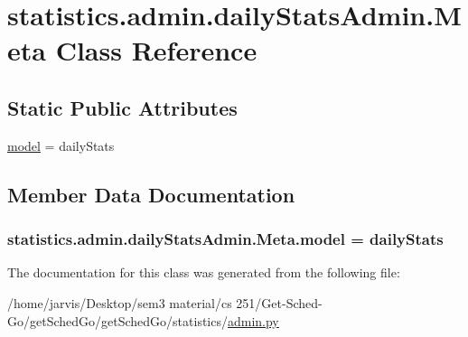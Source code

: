 \hypertarget{classstatistics_1_1admin_1_1dailyStatsAdmin_1_1Meta}{}\section{statistics.\+admin.\+daily\+Stats\+Admin.\+Meta Class Reference}
\label{classstatistics_1_1admin_1_1dailyStatsAdmin_1_1Meta}
\subsection*{Static Public Attributes}
\begin{DoxyCompactItemize}
\item 
\hyperlink{classstatistics_1_1admin_1_1dailyStatsAdmin_1_1Meta_a340579fb9873ff3dc1ec0f1f38c7c092}{model} = daily\+Stats
\end{DoxyCompactItemize}


\subsection{Member Data Documentation}
\subsubsection[{\texorpdfstring{model}{model}}]{\setlength{\rightskip}{0pt plus 5cm}statistics.\+admin.\+daily\+Stats\+Admin.\+Meta.\+model = daily\+Stats\hspace{0.3cm}{\ttfamily [static]}}\hypertarget{classstatistics_1_1admin_1_1dailyStatsAdmin_1_1Meta_a340579fb9873ff3dc1ec0f1f38c7c092}{}\label{classstatistics_1_1admin_1_1dailyStatsAdmin_1_1Meta_a340579fb9873ff3dc1ec0f1f38c7c092}


The documentation for this class was generated from the following file\+:\begin{DoxyCompactItemize}
\item 
/home/jarvis/\+Desktop/sem3 material/cs 251/\+Get-\/\+Sched-\/\+Go/get\+Sched\+Go/get\+Sched\+Go/statistics/\hyperlink{statistics_2admin_8py}{admin.\+py}\end{DoxyCompactItemize}
